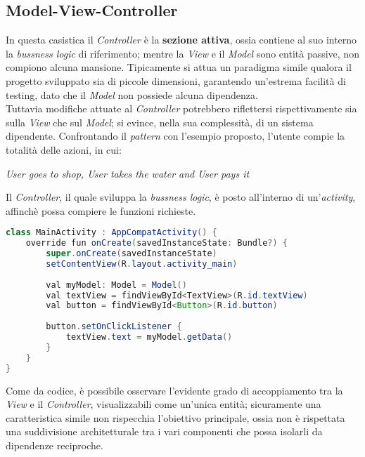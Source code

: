 \documentclass{article}
\begin{document}
\subsection*{Model-View-Controller}
In questa casistica il \textit{Controller} è la \textbf{sezione attiva}, ossia contiene al suo interno la \textit{bussness logic} di riferimento; mentre la \textit{View} e il \textit{Model} sono entità passive, non compiono alcuna mansione. Tipicamente si attua un paradigma simile qualora il progetto sviluppato sia di piccole dimensioni, garantendo un'estrema facilità di testing, dato che il \textit{Model} non possiede alcuna dipendenza.\vspace*{7pt}\\
Tuttavia modifiche attuate al \textit{Controller} potrebbero riflettersi rispettivamente sia sulla \textit{View} che sul \textit{Model}; si evince, nella sua complessità, di un sistema dipendente. 
Confrontando il \textit{pattern} con l'esempio proposto, l'utente compie la totalità delle azioni, in cui:
\begin{center}
    \textit{User goes to shop, User takes the water and User pays it}
\end{center}
Il \textit{Controller}, il quale sviluppa la \textit{bussness logic}, è posto all'interno di un'\textit{activity}, affinchè possa compiere le funzioni richieste.  
\begin{lstlisting}[language = JAVA]
class MainActivity : AppCompatActivity() {
    override fun onCreate(savedInstanceState: Bundle?) {
        super.onCreate(savedInstanceState)
        setContentView(R.layout.activity_main)
        
        val myModel: Model = Model()
        val textView = findViewById<TextView>(R.id.textView)
        val button = findViewById<Button>(R.id.button)
        
        button.setOnClickListener {
            textView.text = myModel.getData()
        }
    }
}
\end{lstlisting} 
Come da codice, è possibile osservare l'evidente grado di accoppiamento tra la \textit{View} e il \textit{Controller}, visualizzabili come un'unica entità; sicuramente una caratteristica simile non rispecchia l'obiettivo principale, ossia non è rispettata una suddivisione architetturale tra i vari componenti che possa isolarli da dipendenze reciproche.
\end{document}

